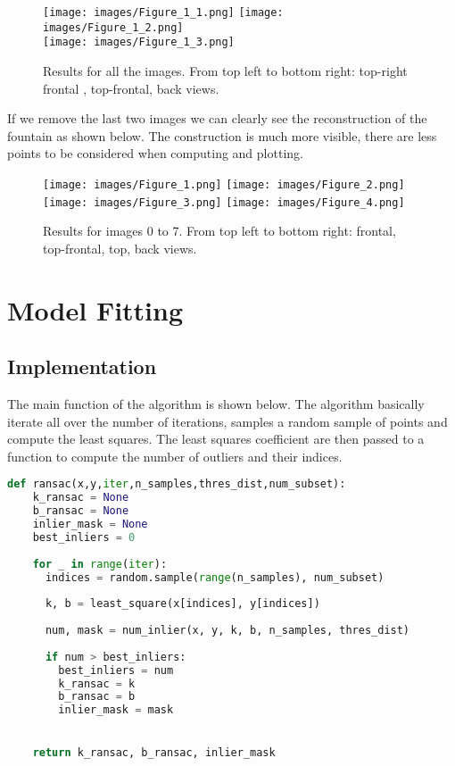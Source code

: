 \documentclass{ETHExercise}
\begin{document}
\begin{figure}[!h]
    \texttt{[image: images/Figure\_1\_1.png]}
  \endminipage
    \texttt{[image: images/Figure\_1\_2.png]}
  \endminipage\\
    \texttt{[image: images/Figure\_1\_3.png]}
  \endminipage
  \caption{Results for all the images. From top left to bottom right:
  top-right frontal , top-frontal, back views.}
\end{figure}

\newpage
If we remove the last two images we can clearly see the reconstruction 
of the fountain as shown below. The construction is much more visible,
there are less points to be considered when computing and plotting.


\begin{figure}[!h]
    \texttt{[image: images/Figure\_1.png]}
  \endminipage
    \texttt{[image: images/Figure\_2.png]}
  \endminipage\\
    \texttt{[image: images/Figure\_3.png]}
  \endminipage
    \texttt{[image: images/Figure\_4.png]}
  \endminipage
  \caption{Results for images 0 to 7. From top left to bottom right:
  frontal, top-frontal, top, back views.}
\end{figure}
 
\newpage
\section{Model Fitting}

\subsection{Implementation}

The main function of the algorithm is shown below. The algorithm
basically iterate all over the number of iterations, samples a random sample of
points and compute the least squares. The least squares coefficient are then 
passed to a function to compute the number of outliers and their indices.
\begin{lstlisting}[language=Python, caption=RANSAC]
  def ransac(x,y,iter,n_samples,thres_dist,num_subset):
    k_ransac = None
    b_ransac = None
    inlier_mask = None
    best_inliers = 0
  
    for _ in range(iter):
      indices = random.sample(range(n_samples), num_subset)
    
      k, b = least_square(x[indices], y[indices])
    
      num, mask = num_inlier(x, y, k, b, n_samples, thres_dist)
      
      if num > best_inliers:
        best_inliers = num
        k_ransac = k
        b_ransac = b
        inlier_mask = mask


    return k_ransac, b_ransac, inlier_mask
\end{lstlisting}
\end{document}
